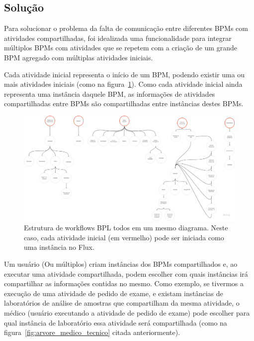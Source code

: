 \subsection{Solução}

Para solucionar o problema da falta de comunicação entre diferentes BPMs com atividades compartilhadas, foi idealizada uma funcionalidade para integrar múltiplos BPMs com atividades que se repetem com a criação de um grande BPM agregado com múltiplas atividades iniciais.

Cada atividade inicial representa o início de um BPM, podendo existir uma ou mais atividades iniciais (como na figura~\ref{fig:bpl_completo}).
Como cada atividade inicial ainda representa uma instância daquele BPM, as informações de atividades compartilhadas entre BPMs são compartilhadas entre instâncias destes BPMs.

\begin{figure}
    \centering
    \includegraphics[width=1\textwidth]{imgs/BPL/bpl_completo.png}
    \caption{Estrutura de workflows BPL todos em um mesmo diagrama. Neste caso, cada atividade inicial (em vermelho) pode ser iniciada como uma instância no Flux.}
    \label{fig:bpl_completo}
\end{figure}

Um usuário (Ou múltiplos) criam instâncias dos BPMs compartilhados e, ao executar uma atividade compartilhada, podem escolher com quais instâncias irá compartilhar as informações contidas no mesmo.
Como exemplo, se tivermos a execução de uma atividade de pedido de exame, e existam instâncias de laboratórios de análise de amostras que compartilham da mesma atividade, o médico (usuário executando a atividade de pedido de exame) pode escolher para qual instância de laboratório essa atividade será compartilhada (como na figura~\ref{fig:arvore_medico_tecnico} citada anteriormente).

